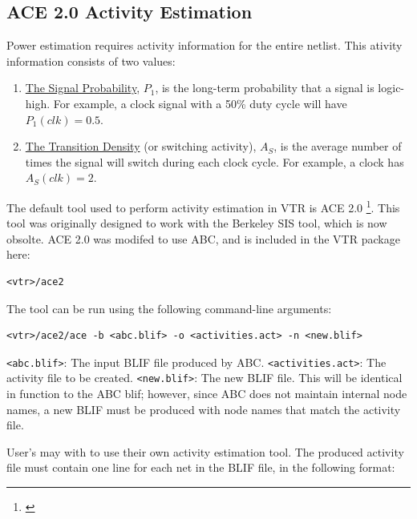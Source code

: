 \documentclass[letterpaper,twoside,10pt]{article}
\begin{document}
\subsection{ACE 2.0 Activity Estimation}
Power estimation requires activity information for the entire netlist.  This ativity information consists of two values:
\vspace{-10pt}
\begin{enumerate}
	\item  \underline{The Signal Probability}, $P_1$, is the long-term probability that a signal is logic-high.  For example, a clock signal with a 50\% duty cycle will have $P_1(clk) = 0.5$.
	\item \underline{The Transition Density} (or switching activity), $A_S$, is the average number of times the signal will switch during each clock cycle.  For example, a clock has $A_S(clk)=2$.
\end{enumerate}

The default tool used to perform activity estimation in VTR is ACE 2.0 \footnote{\cite{ace2}}.  
This tool was originally designed to work with the Berkeley SIS tool, which is now obsolte.  ACE 2.0 was modifed to use ABC, and is included in the VTR package here:

\begin{BVerbatim}[bgcolor=LightGray, boxwidth=\textwidth] 
<vtr>/ace2
\end{BVerbatim}

The tool can be run using the following command-line arguments:

\begin{BVerbatim}[bgcolor=LightGray, boxwidth=\textwidth] 
<vtr>/ace2/ace -b <abc.blif> -o <activities.act> -n <new.blif>
\end{BVerbatim}

\texttt{<abc.blif>}: The input BLIF file produced by ABC. \newline
\texttt{<activities.act>}: The activity file to be created. \newline
\texttt{<new.blif>}: The new BLIF file.  This will be identical in function to the ABC blif; however, since ABC does not maintain internal node names, a new BLIF must be produced with node names that match the activity file. \newline
	
User's may with to use their own activity estimation tool.  The produced activity file must contain one line for each net in the BLIF file, in the following format: 
\end{document}
